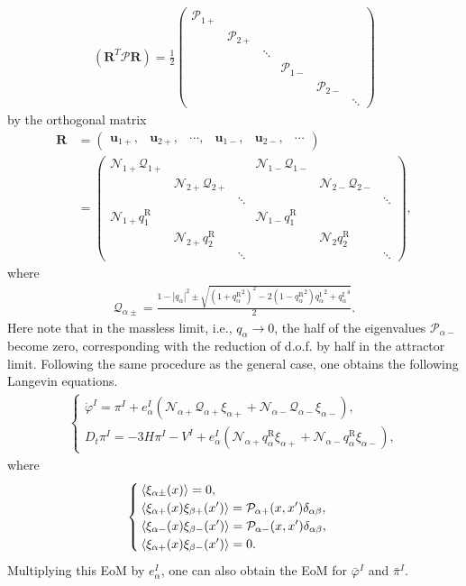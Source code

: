 \documentclass[aps, prd
, preprint
, nofootinbib 
]{revtex4-1}
\newcommand{\calP}{\mathcal{P}}
\newcommand{\bae}[1]{\begin{align} #1 \end{align}}
\newcommand{\bce}[1]{\begin{cases} #1 \end{cases}}
\newcommand{\bpme}[1]{\begin{pmatrix} #1 \end{pmatrix}}
\begin{document}
\bae{
	(\bm{R}^T\bm{\calP}\bm{R})=\frac{1}{2}
	\bpme{
		\calP_{1+} &&&&& \\
		& \calP_{2+} &&&& \\
		&& \ddots &&& \\
		&&& \calP_{1-} && \\
		&&&& \calP_{2-} & \\
		&&&&& \ddots
	}
}
by the orthogonal matrix
\bae{
	\bm{R}&=
	\bpme{
		\bm{u}_{1+}, & \bm{u}_{2+}, & \cdots, & \bm{u}_{1-}, & \bm{u}_{2-}, & \cdots
	} \nonumber \\
	&=
	\bpme{
		\mathcal{N}_{1+}\mathscr{Q}_{1+} &&& \mathcal{N}_{1-}\mathscr{Q}_{1-} && \\
		& \mathcal{N}_{2+}\mathscr{Q}_{2+} &&& \mathcal{N}_{2-}\mathscr{Q}_{2-} & \\
		&& \ddots &&& \ddots \\
		\mathcal{N}_{1+}q_1^\text{R} &&& \mathcal{N}_{1-}q_1^\text{R} && \\
		& \mathcal{N}_{2+}q_2^\text{R} &&& \mathcal{N}_{2}q_2^\text{R} & \\
		&& \ddots &&& \ddots
	},
}
where
\bae{
	\mathscr{Q}_{\alpha\pm}=\frac{1-|q_\alpha|^2
	\pm\sqrt{(1+{q_\alpha^\text{R}}^2)^2-2(1-{q_\alpha^\text{R}}^2){q_\alpha^\text{I}}^2+{q_\alpha^\text{I}}^4}}{2}.
}
Here note that in the massless limit, i.e., $q_\alpha\to0$, the half of the eigenvalues $\calP_{\alpha-}$ become zero,
corresponding with the reduction of d.o.f. by half in the attractor limit.
Following the same procedure as the general case, one obtains the following Langevin equations.
\bae{
	\bce{
		\displaystyle
		\dot{\varphi}^I=\pi^I+e^I_\alpha\left(\mathcal{N}_{\alpha+}\mathscr{Q}_{\alpha+}\xi_{\alpha+}
		+\mathcal{N}_{\alpha-}\mathscr{Q}_{\alpha-}\xi_{\alpha-}\right), \\
		\displaystyle
		D_t\pi^I=-3H\pi^I-V^I+e^I_\alpha\left(\mathcal{N}_{\alpha+}q_{\alpha}^\text{R}\xi_{\alpha+}
		+\mathcal{N}_{\alpha-}q_{\alpha}^\text{R}\xi_{\alpha-}\right),
	}
}
where
\bae{
	\bce{
		\displaystyle
		\braket{\xi_{\alpha\pm}(x)}=0, \\
		\displaystyle
		\braket{\xi_{\alpha+}(x)\xi_{\beta+}(x^\prime)}=\mathcal{P}_{\alpha+}(x,x^\prime)\delta_{\alpha\beta}, \\
		\displaystyle
		\braket{\xi_{\alpha-}(x)\xi_{\beta-}(x^\prime)}=\mathcal{P}_{\alpha-}(x,x^\prime)\delta_{\alpha\beta}, \\
		\displaystyle
		\braket{\xi_{\alpha+}(x)\xi_{\beta-}(x^\prime)}=0.
	}
}
Multiplying this EoM by $e^I_\alpha$, one can also obtain the EoM for $\bar{\varphi}^I$ and $\bar{\pi}^I$.
\end{document}

